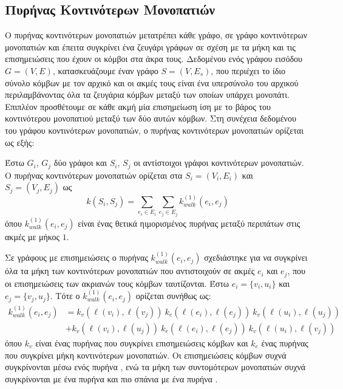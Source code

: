 \subsection{Πυρήνας Κοντινότερων Μονοπατιών}
Ο πυρήνας κοντινότερων μονοπατιών  μετατρέπει κάθε γράφο, σε γράφο κοντινότερων μονοπατιών και έπειτα συγκρίνει ένα ζευγάρι γράφων σε σχέση με τα μήκη και τις επισημειώσεις που έχουν οι κόμβοι στα άκρα τους.
Δεδομένου ενός γράφου εισόδου $G=(V,E)$, κατασκευάζουμε έναν γράφο  $S=(V,E_s)$, που περιέχει το ίδιο σύνολο κόμβων με τον αρχικό και οι ακμές τους είναι ένα υπερσύνολο του αρχικού περιλαμβάνοντας όλα τα ζευγάρια κόμβων μεταξύ των οποίων υπάρχει μονοπάτι.
Επιπλέον προσθέτουμε σε κάθε ακμή μία επισημείωση ίση με το βάρος του κοντινότερου μονοπατιού μεταξύ των δύο αυτών κόμβων.
Στη συνέχεια δεδομένου του γράφου κοντινότερων μονοπατιών, ο πυρήνας κοντινότερων μονοπατιών ορίζεται ως εξής:
\begin{definition}
	Έστω $G_i$, $G_j$ δύο γράφοι και $S_i$, $S_j$ οι αντίστοιχοι γράφοι κοντινότερων μονοπατιών.
	Ο πυρήνας κοντινότερων μονοπατιών ορίζεται στα $S_i=(V_i,E_i)$ και $S_j=(V_j,E_j)$ ως
	\begin{equation}
		k(S_i,S_j) = \sum_{e_i \in E_i} \sum_{e_j \in E_j} k_{walk}^{(1)}(e_i, e_j)
	\end{equation}
	όπου $k_{walk}^{(1)}(e_i, e_j)$ είναι ένας θετικά ηιμορισμένος πυρήνας μεταξύ περιπάτων στις ακμές με μήκος $1$.
\end{definition}
Σε γράφους με επισημειώσεις ο πυρήνας $k_{walk}^{(1)}(e_i, e_j)$ σχεδιάστηκε για να συγκρίνει όλα τα μήκη των κοντινότερων μονοπατιών που αντιστοιχούν σε ακμές $e_i$ και $e_j$, που οι επισημειώσεις των ακριανών τους κόμβων ταυτίζονται.
Έστω $e_i = \{v_i, u_i\}$ και $e_j = \{v_j, u_j\}$.
Τότε ο $k_{walk}^{(1)}(e_i, e_j)$ ορίζεται συνήθως ως:
\begin{equation}
\begin{split}
	k_{walk}^{(1)}(e_i, e_j) &= k_v(\ell(v_i),\ell(v_j)) \ k_e(\ell(e_i),\ell(e_j)) \ k_v(\ell(u_i),\ell(u_j)) \\
	&+ k_v(\ell(v_i),\ell(u_j)) \ k_e(\ell(e_i),\ell(e_j)) \ k_v(\ell(u_i),\ell(v_j))
\end{split}
\end{equation}
όπου $k_v$ είναι ένας πυρήνας που συγκρίνει επισημειώσεις κόμβων και $k_e$ ένας πυρήνας που συγκρίνει μήκη κοντινότερων μονοπατιών.
Οι επισημειώσεις κόμβων συχνά συγκρίνονται μέσω ενός πυρήνα , ενώ τα μήκη των συντομότερων μονοπατιών συχνά συγκρίνονται με ένα πυρήνα  και πιο σπάνια με ένα πυρήνα  \cite{borgwardt2005shortest}.
